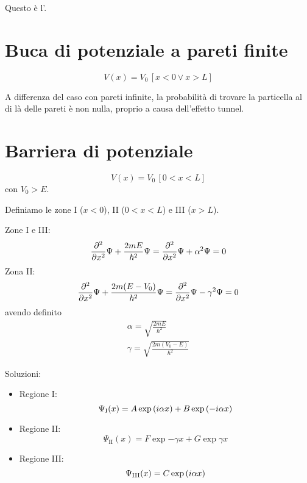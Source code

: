 Questo è l'.

\section{Buca di potenziale a pareti finite}

\begin{equation}
    V(x) = V_0 \, [x < 0 \lor x > L]
\end{equation}

A differenza del caso con pareti infinite, la probabilità di trovare la particella al di là delle pareti è non nulla, proprio a causa dell'effetto tunnel.

\section{Barriera di potenziale}

\begin{equation}
    V(x) = V_0 \, [0 < x < L]
\end{equation}
con $V_0 > E$.

Definiamo le zone I ($x < 0$), II ($0 < x < L$) e III ($x > L$).

Zone I e III:
\begin{equation}
    \parder[][2]{x} \Psi + \frac{2 m E}{\hbar^2} \Psi
    = \parder[][2]{x} \Psi + \alpha^2 \Psi
    = 0
\end{equation}
Zona II:
\begin{equation}
    \parder[][2]{x} \Psi + \frac{2 m (E - V_0)}{\hbar^2} \Psi
    = \parder[][2]{x} \Psi - \gamma^2 \Psi
    = 0
\end{equation}
avendo definito
\begin{subequations}
\begin{gather}
    \alpha = \sqrt{\frac{2 m E}{\hbar^2}} \\
    \gamma = \sqrt{\frac{2 m (V_0 - E)}{\hbar^2}}
\end{gather}
\end{subequations}

Soluzioni:
\begin{itemize}
    \item Regione I:
    \begin{equation}
        \Psi_\mathrm{I}(x) = A \operatorname{exp}\left( i \alpha x \right) + B \operatorname{exp}\left( -i \alpha x \right)
    \end{equation}
    \item Regione II:
    \begin{equation}
        \Psi_\mathrm{II}(x) = F \exp{-\gamma x} + G \exp{\gamma x}
    \end{equation}
    \item Regione III:
    \begin{equation}
        \Psi_\mathrm{III}(x) = C \operatorname{exp}\left( i \alpha x \right)
    \end{equation}
\end{itemize}

